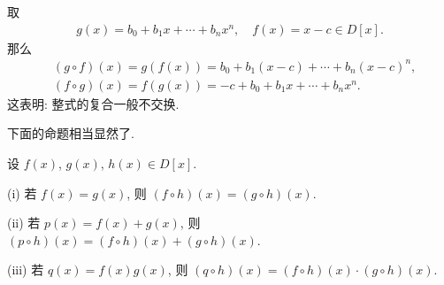 \begin{example}
    取
    \begin{align*}
        g(x) = b_0 + b_1 x + \cdots + b_n x^n, \quad f(x) = x - c \in D[x].
    \end{align*}
    那么
    \begin{align*}
         & (g \circ f) (x) = g(f(x)) = b_0 + b_1 (x-c) + \cdots + b_n (x-c)^n, \\
         & (f \circ g) (x) = f(g(x)) = -c + b_0 + b_1 x + \cdots + b_n x^n.
    \end{align*}
    这表明: 整式的复合一般不交换.
\end{example}

下面的命题相当显然了.

\begin{proposition}
    设 $f(x)$, $g(x)$, $h(x) \in D[x]$.

    (i) 若 $f(x) = g(x)$, 则 $(f \circ h)(x) = (g \circ h)(x)$.

    (ii) 若 $p(x) = f(x) + g(x)$, 则 $(p \circ h)(x) = (f \circ h)(x) + (g \circ h)(x)$.

    (iii) 若 $q(x) = f(x) g(x)$, 则 $(q \circ h)(x) = (f \circ h)(x) \cdot (g \circ h)(x)$.
\end{proposition}

